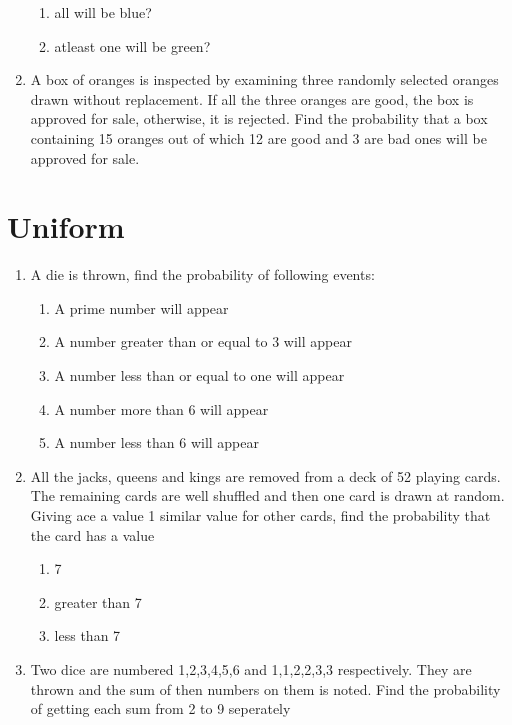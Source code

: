 \begin{enumerate}[label=\thesection.\arabic*,ref=\thesection.\theenumi]
\begin{enumerate}
\item all will be blue?
\item atleast one will be green?
\end{enumerate}
\solution

\item A box of oranges is inspected by examining three randomly selected oranges drawn without replacement. If all the three oranges are good, the box is approved for sale, otherwise, it is rejected. Find the probability that a box containing 15 oranges out of which 12 are good and 3 are bad ones will be approved for sale.\\
	\solution

    \end{enumerate}
    \section{Uniform}
\begin{enumerate}[label=\thesection.\arabic*,ref=\thesection.\theenumi]
\item A die is thrown, find the probability of following events:
\begin{enumerate}
\item A prime number will appear
\item A number greater than or equal to 3 will appear
\item A number less than or equal to one will appear
\item A number more than 6 will appear
\item A number less than 6 will appear
\end{enumerate}
\solution

\item All the jacks, queens and kings are removed from a deck of 52 playing cards. The remaining cards are well shuffled and then one card is drawn at random. Giving ace a value 1 similar value for other cards, find the probability that the card has a value 
\begin{enumerate}
	\item 7
	\item greater than 7
	\item less than 7
\end{enumerate}

\item Two dice are numbered 1,2,3,4,5,6 and 1,1,2,2,3,3 respectively. They are thrown and the sum of then numbers on them is noted. Find the probability of getting each sum from 2 to 9 seperately
\solution

    \end{enumerate}

